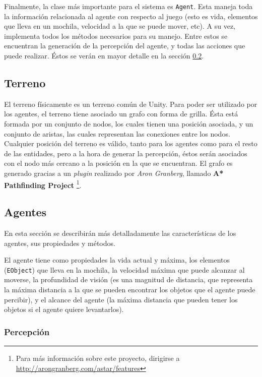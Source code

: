 \documentclass[a4paper,oneside]{article}
\begin{document}
Finalmente, la clase más importante para el sistema es \texttt{Agent}. Esta
maneja toda la información relacionada al agente con respecto al juego (esto es
vida, elementos que lleva en un mochila, velocidad a la que se puede mover,
etc). A su vez, implementa todos los métodos necesarios para su manejo. Entre
estos se encuentran la generación de la percepción del agente, y todas las
acciones que puede realizar. Éstos se verán en mayor detalle en la sección
\ref{sec:agentes}.

\subsection{Terreno}

El terreno físicamente es un terreno común de Unity. Para poder ser utilizado
por los agentes, el terreno tiene asociado un grafo con forma de grilla. Ésta
está formada por un conjunto de nodos, los cuales tienen una posición asociada,
y un conjunto de aristas, las cuales representan las conexiones entre los nodos.
Cualquier posición del terreno es válido, tanto para los agentes como para el
resto de las entidades, pero a la hora de generar la percepción, éstos serán
asociados con el nodo más cercano a la posición en la que se encuentran. El
grafo es generado gracias a un \textit{plugin} realizado por \textit{Aron
Granberg}, llamado \textbf{A* Pathfinding Project} \footnote{Para más
información sobre este proyecto, dirigirse
a \url{http://arongranberg.com/astar/features}}.

\subsection{Agentes}

\label{sec:agentes}

En esta sección se describirán más detalladamente las características de los
agentes, sus propiedades y métodos.

El agente tiene como propiedades la vida actual y máxima, los elementos
(\texttt{EObject}) que lleva en la mochila, la velocidad máxima que puede
alcanzar al moverse, la profundidad de visión (es una magnitud de distancia, que
representa la máxima distancia a la que se pueden encontrar los objetos que el
agente puede percibir), y el alcance del agente (la máxima distancia que pueden
tener los objetos si el agente quiere levantarlos).

\subsubsection{Percepción}
\end{document}
